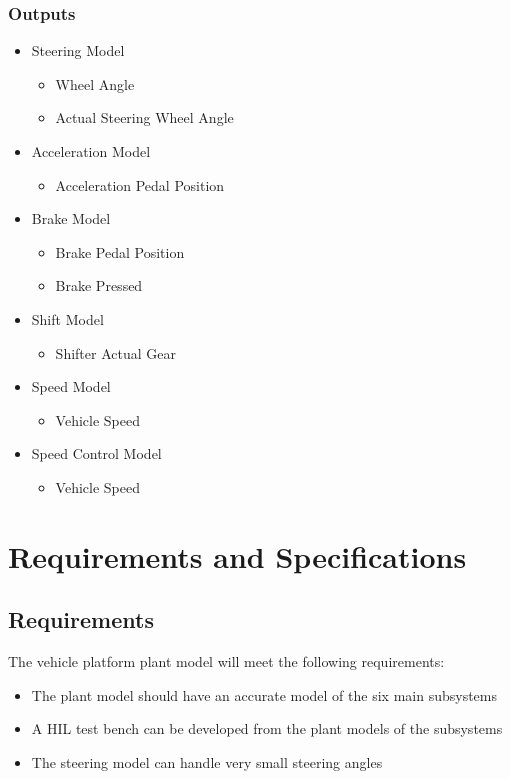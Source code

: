 \documentclass[12pt]{article} %
\begin{document}
\subsubsection{Outputs}

\begin{itemize}
    \item Steering Model
    \begin{itemize}
    		\item Wheel Angle
    		\item Actual Steering Wheel Angle
    \end{itemize}
    \item Acceleration Model
    \begin{itemize}
    		\item Acceleration Pedal Position
    \end{itemize}
    \item Brake Model
    \begin{itemize}
    		\item Brake Pedal Position
    		\item Brake Pressed
    \end{itemize}
    \item Shift Model
    \begin{itemize}
    		\item Shifter Actual Gear
    \end{itemize}
    \item Speed Model
    \begin{itemize}
    		\item Vehicle Speed
    \end{itemize}
    \item Speed Control Model
    \begin{itemize}
    		\item Vehicle Speed
    \end{itemize}
\end{itemize}

\section{Requirements and Specifications}
\subsection{Requirements}
The vehicle platform plant model will meet the following requirements:
\begin{itemize}
    \item The plant model should have an accurate model of the six main subsystems
    \item A HIL test bench can be developed from the plant models of the subsystems
    \item The steering model can handle very small steering angles
\end{itemize}
\end{document}
